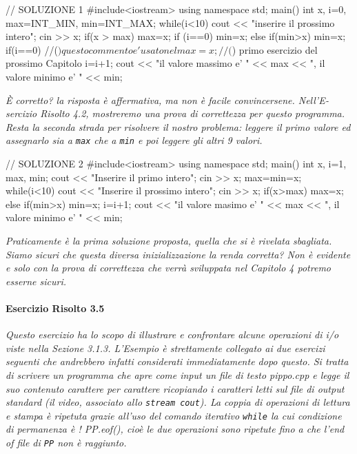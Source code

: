 \begin{codice}

// SOLUZIONE 1
#include<iostream>
using namespace std;
main() {
  int x, i=0, max=INT_MIN, min=INT_MAX;
  while(i<10) {
    cout << "inserire il prossimo intero";
    cin >> x; 
    if(x > max) {
      max=x;
      if (i==0)
        min=x;
    }
    else
      if(min>x) {
        min=x;
        if(i==0) //($) questo commento e' usato nel
        max=x;   //($) primo esercizio del prossimo Capitolo
      }
    i=i+1;
  }
  cout << "il valore massimo e' " << max << ", il valore minimo e' " << min;
}
\end{codice}

\textit{È corretto? la risposta è affermativa, ma non è facile convincersene.
Nell'E­sercizio Risolto 4.2, mostreremo una prova di correttezza per questo programma.
Resta la seconda strada per risolvere il nostro problema: leggere il primo valore ed assegnarlo sia a \texttt{max} che a \texttt{min} e poi leggere gli altri 9 valori.}

\begin{codice}

// SOLUZIONE 2
#include<iostream>
using namespace std;
main() {
  int x, i=1, max, min;
  cout << "Inserire il primo intero";
  cin >> x;
  max=min=x;
  while(i<10) {
    cout << "Inserire il prossimo intero";
    cin >> x;
    if(x>max)
      max=x;
    else
      if(min>x)
        min=x;
    i=i+1;
  }
  cout << "il valore masimo e' " << max << ", il valore minimo e' " << min;
}
\end{codice}

\noindent \textit{Praticamente è la prima soluzione proposta, quella che si è rivelata sbagliata.
Siamo sicuri che questa diversa inizializzazione la renda corretta?
Non è evidente e solo con la prova di correttezza che verrà sviluppata nel Capitolo 4 potremo esserne sicuri.}

\paragraph{Esercizio Risolto 3.5}
\textit{Questo esercizio ha lo scopo di illustrare e confrontare alcune operazioni di i/o viste nella Sezione 3.1.3.
L'Esempio è strettamente collegato ai due esercizi seguenti che andrebbero infatti considerati immediatamente dopo questo.
Si tratta di scrivere un programma che apre come input un file di testo pip­po.cpp e legge il suo contenuto carattere per carattere ricopiando i caratteri letti sul file di output standard (il video, associato allo \texttt{stream cout}).
La coppia di operazioni di lettura e stampa è ripetuta grazie all'uso del comando iterativo \texttt{while} la cui condizione di permanenza è ! PP.eof(), cioè le due operazioni sono ripetute fino a che l'end of file di \texttt{PP} non è raggiunto.}

